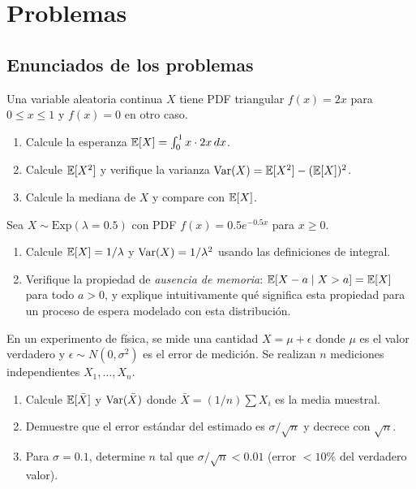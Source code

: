 \section*{Problemas}

\subsection*{Enunciados de los problemas}

\begin{problema}
	\label{prob:4e01dbd}
	Una variable aleatoria continua $X$ tiene PDF triangular $f(x) = 2x$ para $0 \le x \le 1$ y $f(x) = 0$ en otro caso.
	\begin{enumerate}
		\item Calcule la esperanza $\mathbb{E}[X] = \int_{0}^{1} x \cdot 2x\,dx$.
		\item Calcule $\mathbb{E}[X^{2}]$ y verifique la varianza $\operatorname{Var}(X) = \mathbb{E}[X^{2}] - (\mathbb{E}[X])^{2}$.
		\item Calcule la mediana de $X$ y compare con $\mathbb{E}[X]$.
	\end{enumerate}
\end{problema}

\begin{problema}
	\label{prob:f43c638}
	Sea $X \sim \text{Exp}(\lambda = 0.5)$ con PDF $f(x) = 0.5 e^{-0.5 x}$ para $x \ge 0$.
	\begin{enumerate}
		\item Calcule $\mathbb{E}[X] = 1/\lambda$ y $\operatorname{Var}(X) = 1/\lambda^{2}$ usando las definiciones de integral.
		\item Verifique la propiedad de \emph{ausencia de memoria}: $\mathbb{E}[X - a \mid X > a] = \mathbb{E}[X]$ para todo $a > 0$, y explique intuitivamente qué significa esta propiedad para un proceso de espera modelado con esta distribución.
	\end{enumerate}
\end{problema}

\begin{problema}
	\label{prob:7b147c4}
	En un experimento de física, se mide una cantidad $X = \mu + \epsilon$ donde $\mu$ es el valor verdadero y $\epsilon \sim N(0, \sigma^{2})$ es el error de medición. Se realizan $n$ mediciones independientes $X_{1}, \dots, X_{n}$.
	\begin{enumerate}
		\item Calcule $\mathbb{E}[\bar{X}]$ y $\operatorname{Var}(\bar{X})$ donde $\bar{X} = (1/n) \sum X_{i}$ es la media muestral.
		\item Demuestre que el error estándar del estimado es $\sigma/\sqrt{n}$ y decrece con $\sqrt{n}$.
		\item Para $\sigma = 0.1$, determine $n$ tal que $\sigma/\sqrt{n} < 0.01$ (error $< 10\%$ del verdadero valor).
	\end{enumerate}
\end{problema}

